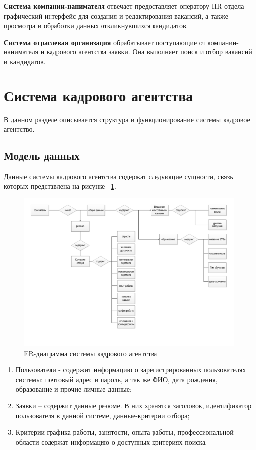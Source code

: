 \textbf{Система компании-нанимателя} отвечает предоставляет оператору HR-отдела графический интерфейс для создания и редактирования вакансий, а также просмотра и обработки данных откликнувшихся кандидатов. 

\textbf{Система отраслевая организация} обрабатывает поступающие от компании-нанимателя и кадрового агентства заявки. Она выполняет поиск и отбор вакансий и кандидатов.


\section{Система кадрового агентства}
В данном разделе описывается структура и функционирование системы кадровое агентство. 

\subsection{Модель данных}
Данные системы кадрового агентства содержат следующие сущности, связь которых представлена на рисунке ~\ref{fig:data-model-empui}.

\begin{figure}[h!]
\centering
 \includegraphics[width=1\textwidth]{include/data-model-cvcol.pdf}
\caption{ER-диаграмма системы кадрового агентства}
\label{fig:data-model-empui}
\end{figure}

\begin{enumerate}
\item Пользователи - содержит информацию о зарегистрированных пользователях системы: почтовый адрес и пароль, а так же ФИО, дата рождения, образование и прочие личные данные;
\item Заявки – содержит данные резюме. В них хранятся заголовок, идентификатор пользователя в данной системе, данные-критерии отбора;
\item Критерии графика работы, занятости, опыта работы, профессиональной области содержат информацию о доступных критериях поиска.
\end{enumerate}

